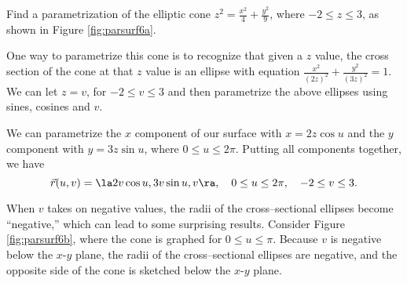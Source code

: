 {Find a parametrization of the elliptic cone $z^2 = \frac{x^2}{4}+\frac{y^2}{9}$, where $-2\leq z\leq 3$, as shown in Figure \ref{fig:parsurf6a}.
}
{One way to parametrize this cone is to recognize that given a $z$ value, the cross section of the cone at that $z$ value is an ellipse with equation $\frac{x^2}{(2z)^2} + \frac{y^2}{(3z)^2}=1$. We can let $z=v$, for $-2\leq v\leq 3$ and then parametrize the above ellipses using sines, cosines and $v$.

We can parametrize the $x$ component of our surface with $x=2z\cos u$ and the $y$ component with $y=3z\sin u$, where $0\leq u\leq 2\pi$. Putting all components together, we have
$$\vec r(u,v) = \la 2v\cos u, 3v\sin u, v\ra,\quad 0\leq u\leq 2\pi,\quad -2\leq v\leq 3.$$



When $v$ takes on negative values, the radii of the cross--sectional ellipses become ``negative,'' which can lead to some surprising results. Consider Figure \ref{fig:parsurf6b}, where the cone is graphed for $0\leq u\leq \pi$. Because $v$ is negative below the $x$-$y$ plane, the radii of the cross--sectional ellipses are negative, and the opposite side of the cone is sketched below the $x$-$y$ plane.
}\\

